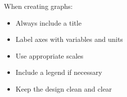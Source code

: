\documentclass[justified,notoc]{tufte-book}
\begin{document}
    \centering

When creating graphs:
\begin{itemize}
    \item Always include a title
    \item Label axes with variables and units
    \item Use appropriate scales
    \item Include a legend if necessary
    \item Keep the design clean and clear
\end{itemize}
\end{document}
